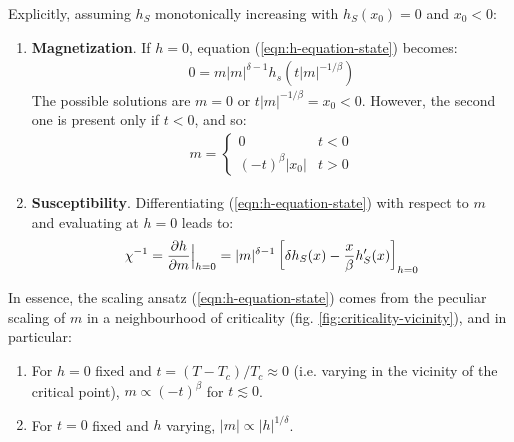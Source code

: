 \documentclass[../../main.tex]{subfiles}
\begin{document}
\medskip

Explicitly, assuming $h_S$ monotonically increasing with $h_S(x_0) = 0$ and $x_0 < 0$:
\begin{enumerate}
    \item \textbf{Magnetization}. If $h=0$, equation (\ref{eqn:h-equation-state}) becomes:
    \begin{align*}
        0 = m|m|^{\delta-1} h_s(t|m|^{-1/\beta})
    \end{align*}
    The possible solutions are $m=0$ or $t|m|^{-1/\beta} = x_0 < 0$. However, the second one is present only if $t < 0$, and so:
    \begin{align*}
        m = \begin{cases}
            0 & t < 0\\
            (-t)^\beta |x_0| & t > 0
        \end{cases}
    \end{align*} %
    \item \textbf{Susceptibility}. Differentiating (\ref{eqn:h-equation-state}) with respect to $m$ and evaluating at $h=0$ leads to:
    \begin{align*}
        \chi^{-1} = \pdv{h}{m}\Big|_{h=0} = |m|^{\delta-1}\left[\delta h_S(x) - \frac{x}{\beta} h_S'(x) \right]_{h=0}
    \end{align*} %
\end{enumerate}

In essence, the scaling ansatz (\ref{eqn:h-equation-state}) comes from the peculiar scaling of $m$ in a neighbourhood of criticality (fig. \ref{fig:criticality-vicinity}), and in particular: 
\begin{enumerate}[label=\alph*)]
    \item \label{item:1} For $h=0$ fixed and $t = (T-T_c)/T_c \approx 0$ (i.e. varying in the vicinity of the critical point), $m \propto (-t)^\beta$ for $t \lesssim 0$.
    \item \label{item:2} For $t=0$ fixed and $h$ varying, $|m| \propto |h|^{1/\delta}$.
\end{enumerate} %
\end{document}
